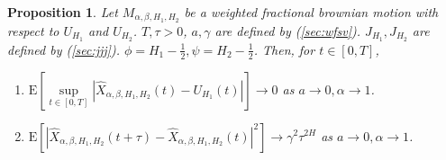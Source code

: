 \documentclass[12pt]{beamer}
\newcommand{\brkt}[1]{\left({#1} \right)}
\newtheorem{proposition}{Proposition}
\begin{document}
\begin{frame}
  \begin{proposition}
  Let $M_{\alpha,\beta,H_1,H_2}$ be a weighted fractional brownian motion with respect to $U_{H_1}$ and $U_{H_2}$. $T, \tau>0$, $a, \gamma$ are defined by (\ref{sec:wfsv}). $J_{H_1}, J_{H_2}$ are defined by (\ref{sec:jjj}). $\phi=H_1-\frac{1}{2}, \psi=H_2-\frac{1}{2}$. Then, for $t\in [0, T]$,
\begin{enumerate}[topsep=0pt, itemsep=-1ex, partopsep=1ex, parsep=1ex, label=(\roman*)]	
  \item $\mathrm{E}[\sup\limits_{t\in[0,T]}|\hat{X}_{\alpha,\beta,H_1,H_2}(t) - U_{H_1}(t)|] \rightarrow 0$
	as $a\rightarrow 0, \alpha\rightarrow 1$.
  \item $\mathrm{E}[|\hat{X}_{\alpha,\beta,H_1,H_2}(t+\tau) - \hat{X}_{\alpha,\beta,H_1,H_2}(t)|^2] \rightarrow  \gamma^2 \tau^{2H}$
	as $a\rightarrow 0, \alpha\rightarrow 1$.
  \end{enumerate}
  \end{proposition}
\end{frame}

\end{document}
